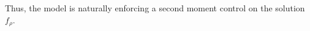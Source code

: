 \documentclass[11pt]{article}
\theoremstyle{plain}
\theoremstyle{definition}
\newcommand{\1}{\mathbf{1}}
\begin{document}
Thus, the model 
is naturally enforcing a second moment control on the solution $f_\rho$.
\end{document}
